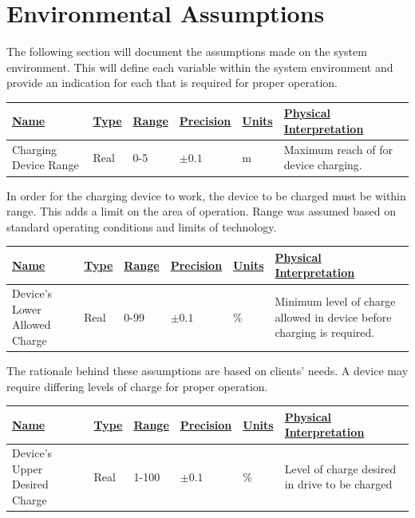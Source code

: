 \documentclass[12pt, titlepage]{article}
\begin{document}
\section{Environmental Assumptions}
The following section will document the assumptions made on the system environment. This will define each variable within the system environment and provide an indication for each that is required for proper operation.

\begin{center}
\begin{tabular}{|p{3cm}|p{1cm}|p{1cm}|p{2cm}|p{1cm}|p{6cm}|}
\hline
\underline{Name} & \underline{Type} & \underline{Range} & \underline{Precision} & \underline{Units} & \underline{Physical Interpretation}\\[5pt]
\hline
Charging Device Range & Real & 0-5 & $\pm0.1$ & m & Maximum reach of for device charging.\\
\hline
\end{tabular}
\end{center}


In order for the charging device to work, the device to be charged must be within range. This adds a limit on the area of operation. Range was assumed based on standard operating conditions and limits of technology.

\begin{center}
\begin{tabular}{|p{3cm}|p{1cm}|p{1cm}|p{2cm}|p{1cm}|p{6cm}|}
\hline
\underline{Name} & \underline{Type} & \underline{Range} & \underline{Precision} & \underline{Units} & \underline{Physical Interpretation}\\[5pt]
\hline
Device's Lower Allowed Charge & Real & 0-99 & $\pm0.1$ & \% & Minimum level of charge allowed in device before charging is required.\\
\hline
\end{tabular}
\end{center}

The rationale behind these assumptions are based on clients' needs. A device may require differing levels of charge for proper operation. 

\begin{center}
\begin{tabular}{|p{3cm}|p{1cm}|p{1cm}|p{2cm}|p{1cm}|p{6cm}|}
\hline
\underline{Name} & \underline{Type} & \underline{Range} & \underline{Precision} & \underline{Units} & \underline{Physical Interpretation}\\[5pt]
\hline
Device's Upper Desired Charge & Real & 1-100 & $\pm0.1$ & \% & Level of charge desired in drive to be charged\\
\hline
\end{tabular}
\end{center}
\end{document}
